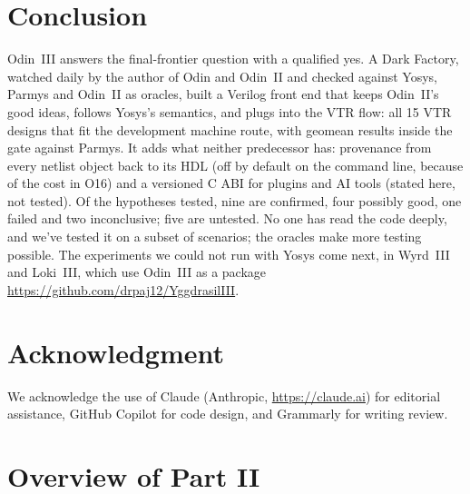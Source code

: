 \documentclass[conference]{IEEEtran}
\begin{document}
\section{Conclusion}
\label{sec:conclusion}

Odin~III answers the final-frontier question with a qualified yes. A Dark Factory, watched daily by the author of Odin and Odin~II and checked against Yosys, Parmys and Odin~II as oracles, built a Verilog front end that keeps Odin~II's good ideas, follows Yosys's semantics, and plugs into the VTR flow: all 15 VTR designs that fit the development machine route, with geomean results inside the gate against Parmys. It adds what neither predecessor has: provenance from every netlist object back to its HDL (off by default on the command line, because of the cost in O16) and a versioned C ABI for plugins and AI tools (stated here, not tested). Of the hypotheses tested, nine are confirmed, four possibly good, one failed and two inconclusive; five are untested. No one has read the code deeply, and we've tested it on a subset of scenarios; the oracles make more testing possible. The experiments we could not run with Yosys come next, in Wyrd~III and Loki~III, which use Odin~III as a package \url{https://github.com/drpaj12/YggdrasilIII}.

\section*{Acknowledgment}
We acknowledge the use of Claude (Anthropic, \url{https://claude.ai}) for editorial assistance, GitHub Copilot for code design, and Grammarly for writing review.




\clearpage
{}

\section{Overview of Part II}
\label{sec:overview}
\end{document}
